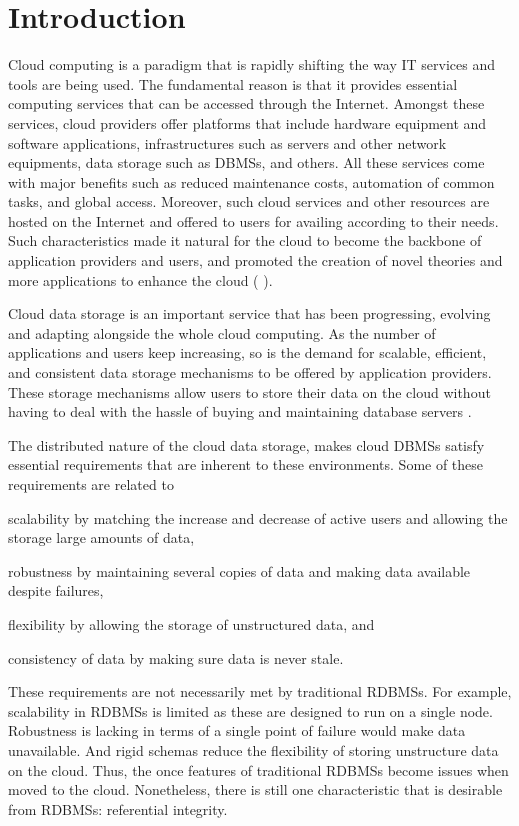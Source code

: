 
\chapter{Introduction} 
Cloud computing is a paradigm that is rapidly shifting the way IT services
and tools are being used. The fundamental reason is that it provides
 essential computing services that can be accessed through the Internet. 
 Amongst these services, cloud providers offer platforms that
 include hardware equipment and software applications, infrastructures such as
 servers and other network equipments, data storage such as \acp{DBMS}, and
 others. All these services come with major benefits such as reduced maintenance
 costs,  automation of common tasks, and global access. Moreover, such cloud
 services and other resources are hosted on the Internet and offered to  
 users for availing according to their needs.  Such characteristics made it
  natural for the  cloud to become  the backbone of application providers and
  users, and promoted the creation of novel theories and more applications to
 enhance the cloud ( ).
 
  
  Cloud data storage is an important service that has been progressing, evolving
  and adapting alongside the whole cloud computing. As the number of
  applications and users keep increasing, so is the demand for scalable, 
  efficient, and consistent data storage mechanisms to be offered by
  application providers. These storage mechanisms allow  users to store
  their data on the cloud without having to deal with the hassle of buying and
  maintaining database servers .

 The distributed nature of the cloud data storage, makes
 cloud \acp{DBMS} satisfy essential requirements that are inherent to these
 environments. Some of these requirements are related to
  \begin{inparaenum}[a)]
 \item  scalability by matching the increase and decrease of active users
 and allowing the storage large amounts of data,
 \item  robustness by maintaining several copies of data and making data
 available despite failures,
 \item  flexibility by allowing the storage of unstructured data, and
 \item  consistency of data by making sure data is never stale.
 \end{inparaenum}
   These requirements are not necessarily met by traditional \acp{RDBMS}. For
   example, scalability in \acp{RDBMS} is limited as these are designed to run
   on a single node. Robustness is lacking in terms of  a single point of
   failure would  make data unavailable. And rigid schemas reduce the
   flexibility of storing unstructure data on the cloud.  Thus, the once
   features of traditional \acp{RDBMS}  become issues when moved to the cloud.
    Nonetheless, there is still one characteristic that is desirable from
   \acp{RDBMS}: referential integrity.
   
